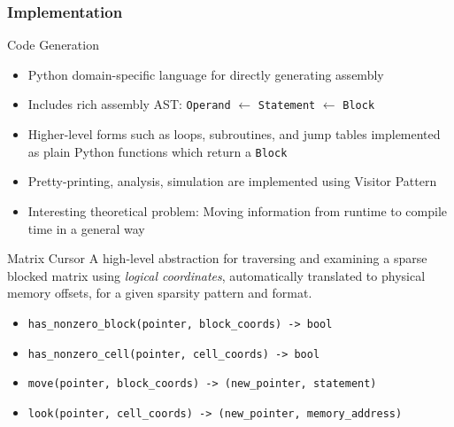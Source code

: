 \documentclass[9pt]{beamer}
\begin{document}
\begin{frame}[fragile]
  \frametitle{Implementation}

  \begin{block}{Code Generation}
    \begin{itemize}
    \item Python domain-specific language for directly generating assembly
    \item Includes rich assembly AST: \texttt{Operand} $\leftarrow$ \texttt{Statement} $\leftarrow$ \texttt{Block} 
    \item Higher-level forms such as loops, subroutines, and jump tables
          implemented as plain Python functions which return a \texttt{Block}
    \item Pretty-printing, analysis, simulation are implemented using Visitor Pattern
    \item Interesting theoretical problem: Moving information from runtime to compile time in a general way
    \end{itemize}
  \end{block}

  \begin{block}{Matrix Cursor}
    A high-level abstraction for traversing and examining a sparse blocked matrix using \emph{logical coordinates}, automatically translated to physical memory offsets, for a given sparsity pattern and format. 
    \begin{itemize}
    \item \verb|has_nonzero_block(pointer, block_coords) -> bool|
    \item \verb|has_nonzero_cell(pointer, cell_coords) -> bool|
    \item \verb|move(pointer, block_coords) -> (new_pointer, statement)|
    \item \verb|look(pointer, cell_coords) -> (new_pointer, memory_address)|
    \end{itemize}
    \end{block}
\end{frame}
\end{document}
